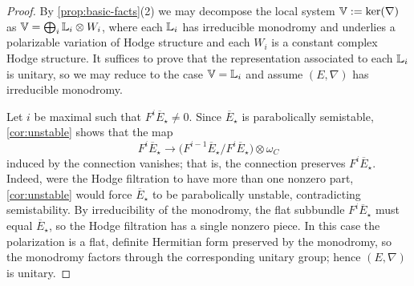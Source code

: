 \begin{proof}
  By \cref{prop:basic-facts}(2) we may decompose the local system
  $\mathbb{V} := \ker(\nabla)$ as $\mathbb{V} = \bigoplus_i \mathbb{L}_i \otimes W_i$, where each
  $\mathbb{L}_i$ has irreducible monodromy and underlies a polarizable variation of
  Hodge structure and each $W_i$ is a constant complex Hodge structure. It
  suffices to prove that the representation associated to each $\mathbb{L}_i$ is unitary,
  so we may reduce to the case $\mathbb{V} = \mathbb{L}_i$ and assume $(E, \nabla)$ has
  irreducible monodromy.

  Let $i$ be maximal such that $F^i \overline{E}_\star \neq 0$. Since
  $\overline{E}_\star$ is parabolically semistable, \cref{cor:unstable} shows that
  the map
  \[
    F^i \overline{E}_\star \to
      \bigl(F^{i-1}\overline{E}_\star / F^i\overline{E}_\star\bigr) \otimes
      \omega_C
  \]
  induced by the connection vanishes; that is, the connection preserves
  $F^i \overline{E}_\star$. Indeed, were the Hodge filtration to have more than
  one nonzero part, \cref{cor:unstable} would force $\overline{E}_\star$ to be
  parabolically unstable, contradicting semistability. By irreducibility of the
  monodromy, the flat subbundle $F^i \overline{E}_\star$ must equal
  $\overline{E}_\star$, so the Hodge filtration has a single nonzero piece. In
  this case the polarization is a flat, definite Hermitian form preserved by the
  monodromy, so the monodromy factors through the corresponding unitary group;
  hence $(E, \nabla)$ is unitary.
\end{proof}

